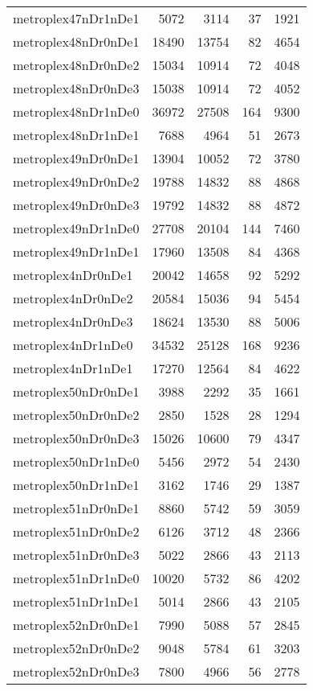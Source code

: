 \begin{tabular}{lrrrr}
metroplex47nDr1nDe1 & 5072 & 3114 & 37 & 1921 \\
metroplex48nDr0nDe1 & 18490 & 13754 & 82 & 4654 \\
metroplex48nDr0nDe2 & 15034 & 10914 & 72 & 4048 \\
metroplex48nDr0nDe3 & 15038 & 10914 & 72 & 4052 \\
metroplex48nDr1nDe0 & 36972 & 27508 & 164 & 9300 \\
metroplex48nDr1nDe1 & 7688 & 4964 & 51 & 2673 \\
metroplex49nDr0nDe1 & 13904 & 10052 & 72 & 3780 \\
metroplex49nDr0nDe2 & 19788 & 14832 & 88 & 4868 \\
metroplex49nDr0nDe3 & 19792 & 14832 & 88 & 4872 \\
metroplex49nDr1nDe0 & 27708 & 20104 & 144 & 7460 \\
metroplex49nDr1nDe1 & 17960 & 13508 & 84 & 4368 \\
metroplex4nDr0nDe1 & 20042 & 14658 & 92 & 5292 \\
metroplex4nDr0nDe2 & 20584 & 15036 & 94 & 5454 \\
metroplex4nDr0nDe3 & 18624 & 13530 & 88 & 5006 \\
metroplex4nDr1nDe0 & 34532 & 25128 & 168 & 9236 \\
metroplex4nDr1nDe1 & 17270 & 12564 & 84 & 4622 \\
metroplex50nDr0nDe1 & 3988 & 2292 & 35 & 1661 \\
metroplex50nDr0nDe2 & 2850 & 1528 & 28 & 1294 \\
metroplex50nDr0nDe3 & 15026 & 10600 & 79 & 4347 \\
metroplex50nDr1nDe0 & 5456 & 2972 & 54 & 2430 \\
metroplex50nDr1nDe1 & 3162 & 1746 & 29 & 1387 \\
metroplex51nDr0nDe1 & 8860 & 5742 & 59 & 3059 \\
metroplex51nDr0nDe2 & 6126 & 3712 & 48 & 2366 \\
metroplex51nDr0nDe3 & 5022 & 2866 & 43 & 2113 \\
metroplex51nDr1nDe0 & 10020 & 5732 & 86 & 4202 \\
metroplex51nDr1nDe1 & 5014 & 2866 & 43 & 2105 \\
metroplex52nDr0nDe1 & 7990 & 5088 & 57 & 2845 \\
metroplex52nDr0nDe2 & 9048 & 5784 & 61 & 3203 \\
metroplex52nDr0nDe3 & 7800 & 4966 & 56 & 2778 \\

\end{tabular}

